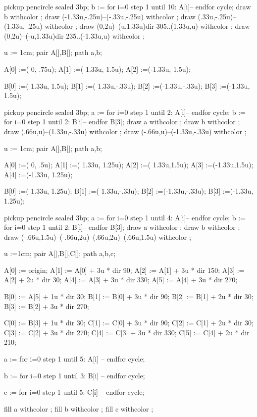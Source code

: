 pickup pencircle scaled 3bp;
b := for i=0 step 1 until 10:
	A[i]--
endfor cycle;
draw b withcolor ;
draw (-1.33u,-.25u)--(-.33u,-.25u) withcolor ;
draw (.33u,-.25u)--(1.33u,-.25u) withcolor ;
draw (0,2u)--(u,1.33u){dir 305}..(1.33u,u) withcolor ;
draw (0,2u)--(-u,1.33u){dir 235}..(-1.33u,u) withcolor ;
\stopreusableMPgraphic

u := 1cm;
pair A[],B[];
path a,b;

A[0] :=(     0, .75u);
A[1] :=( 1.33u, 1.5u);
A[2] :=(-1.33u, 1.5u);

B[0] :=( 1.33u, 1.5u);
B[1] :=( 1.33u,-.33u);
B[2] :=(-1.33u,-.33u);
B[3] :=(-1.33u, 1.5u);

pickup pencircle scaled 3bp;
a := for i=0 step 1 until 2:
	A[i]--
endfor cycle;
b := for i=0 step 1 until 2:
	B[i]--
endfor B[3];
draw a withcolor ;
draw b withcolor ;
draw (.66u,u)--(1.33u,-.33u) withcolor ;
draw (-.66u,u)--(-1.33u,-.33u) withcolor ;
\stopreusableMPgraphic

u := 1cm;
pair A[],B[];
path a,b;

A[0] :=(     0, .5u);
A[1] :=( 1.33u, 1.25u);
A[2] :=( 1.33u,1.5u);
A[3] :=(-1.33u,1.5u);
A[4] :=(-1.33u, 1.25u);

B[0] :=( 1.33u, 1.25u);
B[1] :=( 1.33u,-.33u);
B[2] :=(-1.33u,-.33u);
B[3] :=(-1.33u, 1.25u);

pickup pencircle scaled 3bp;
a := for i=0 step 1 until 4:
	A[i]--
endfor cycle;
b := for i=0 step 1 until 2:
	B[i]--
endfor B[3];
draw a withcolor ;
draw b withcolor ;
draw (-.66u,1.5u)--(-.66u,2u)--(.66u,2u)--(.66u,1.5u) withcolor ;
\stopreusableMPgraphic

u :=1cm;
pair A[],B[],C[];
path a,b,c;


A[0] := origin;
A[1] := A[0] + 3u * dir 90;
A[2] := A[1] + 3u * dir 150;
A[3] := A[2] + 2u * dir 30;
A[4] := A[3] + 3u * dir 330;
A[5] := A[4] + 3u * dir 270;

B[0] := A[5] + 1u * dir 30;
B[1] := B[0] + 3u * dir 90;
B[2] := B[1] + 2u * dir 30;
B[3] := B[2] + 3u * dir 270;

C[0] := B[3] + 1u * dir 30;
C[1] := C[0] + 3u * dir 90;
C[2] := C[1] + 2u * dir 30;
C[3] := C[2] + 3u * dir 270;
C[4] := C[3] + 3u * dir 330;
C[5] := C[4] + 2u * dir 210;

a := for i=0 step 1 until 5:
A[i] --
endfor cycle;

b := for i=0 step 1 until 3:
B[i] --
endfor cycle;

c := for i=0 step 1 until 5:
C[i] --
endfor cycle;

fill a withcolor ;
fill b withcolor ;
fill c withcolor ;

\stopreusableMPgraphic

\stopenvironment
